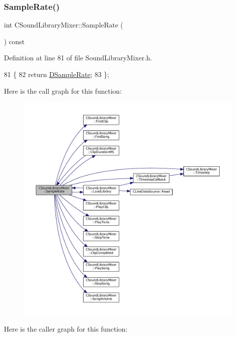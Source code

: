 \subsubsection{\texorpdfstring{Sample\+Rate()}{SampleRate()}}
{\footnotesize\ttfamily int C\+Sound\+Library\+Mixer\+::\+Sample\+Rate (\begin{DoxyParamCaption}{ }\end{DoxyParamCaption}) const\hspace{0.3cm}{\ttfamily [inline]}}



Definition at line 81 of file Sound\+Library\+Mixer.\+h.


\begin{DoxyCode}
81                               \{
82             \textcolor{keywordflow}{return} \hyperlink{classCSoundLibraryMixer_af2d94eb0c2b55d92ff00d18a25cbed6a}{DSampleRate};  
83         \};
\end{DoxyCode}
Here is the call graph for this function\+:
\nopagebreak
\begin{figure}[H]
\begin{center}
\leavevmode
\includegraphics[width=350pt]{classCSoundLibraryMixer_a03221f151dfe72381da5d0d0539bab94_cgraph}
\end{center}
\end{figure}
Here is the caller graph for this function\+:
\nopagebreak
